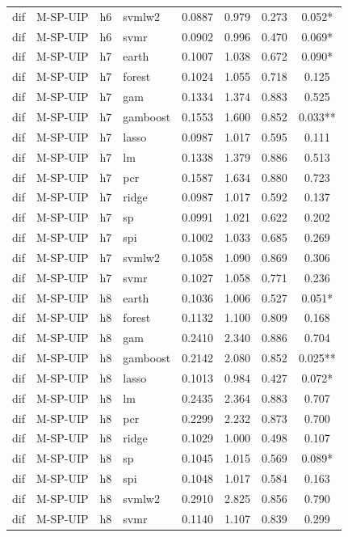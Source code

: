 \begin{ThreePartTable}
\begin{longtable}[t]{llclcccc}
dif & M-SP-UIP & h6 & svmlw2 & 0.0887 & 0.979 & 0.273 & 0.052*\\
dif & M-SP-UIP & h6 & svmr & 0.0902 & 0.996 & 0.470 & 0.069*\\
\addlinespace
dif & M-SP-UIP & h7 & earth & 0.1007 & 1.038 & 0.672 & 0.090*\\
dif & M-SP-UIP & h7 & forest & 0.1024 & 1.055 & 0.718 & 0.125\\
dif & M-SP-UIP & h7 & gam & 0.1334 & 1.374 & 0.883 & 0.525\\
dif & M-SP-UIP & h7 & gamboost & 0.1553 & 1.600 & 0.852 & 0.033**\\
dif & M-SP-UIP & h7 & lasso & 0.0987 & 1.017 & 0.595 & 0.111\\
dif & M-SP-UIP & h7 & lm & 0.1338 & 1.379 & 0.886 & 0.513\\
dif & M-SP-UIP & h7 & pcr & 0.1587 & 1.634 & 0.880 & 0.723\\
dif & M-SP-UIP & h7 & ridge & 0.0987 & 1.017 & 0.592 & 0.137\\
dif & M-SP-UIP & h7 & sp & 0.0991 & 1.021 & 0.622 & 0.202\\
dif & M-SP-UIP & h7 & spi & 0.1002 & 1.033 & 0.685 & 0.269\\
dif & M-SP-UIP & h7 & svmlw2 & 0.1058 & 1.090 & 0.869 & 0.306\\
dif & M-SP-UIP & h7 & svmr & 0.1027 & 1.058 & 0.771 & 0.236\\
\addlinespace
dif & M-SP-UIP & h8 & earth & 0.1036 & 1.006 & 0.527 & 0.051*\\
dif & M-SP-UIP & h8 & forest & 0.1132 & 1.100 & 0.809 & 0.168\\
dif & M-SP-UIP & h8 & gam & 0.2410 & 2.340 & 0.886 & 0.704\\
dif & M-SP-UIP & h8 & gamboost & 0.2142 & 2.080 & 0.852 & 0.025**\\
dif & M-SP-UIP & h8 & lasso & 0.1013 & 0.984 & 0.427 & 0.072*\\
dif & M-SP-UIP & h8 & lm & 0.2435 & 2.364 & 0.883 & 0.707\\
dif & M-SP-UIP & h8 & pcr & 0.2299 & 2.232 & 0.873 & 0.700\\
dif & M-SP-UIP & h8 & ridge & 0.1029 & 1.000 & 0.498 & 0.107\\
dif & M-SP-UIP & h8 & sp & 0.1045 & 1.015 & 0.569 & 0.089*\\
dif & M-SP-UIP & h8 & spi & 0.1048 & 1.017 & 0.584 & 0.163\\
dif & M-SP-UIP & h8 & svmlw2 & 0.2910 & 2.825 & 0.856 & 0.790\\
dif & M-SP-UIP & h8 & svmr & 0.1140 & 1.107 & 0.839 & 0.299\\

\end{longtable}
\end{ThreePartTable}
